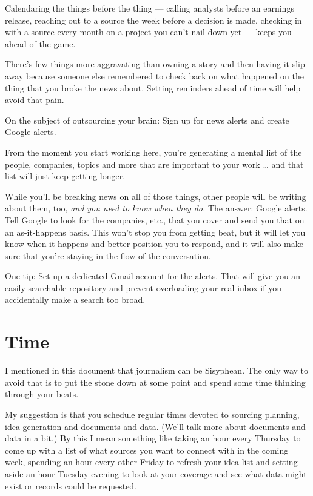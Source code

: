 \documentclass[
  12pt,
  american,
  letterpaperpaper,
  extrafontsizes,onecolumn,openright
  ]{memoir}
\begin{document}
Calendaring the things before the thing --- calling analysts before an earnings release, reaching out to a source the week before a decision is made, checking in with a source every month on a project you can't nail down yet --- keeps you ahead of the game.

There's few things more aggravating than owning a story and then having it slip away because someone else remembered to check back on what happened on the thing that you broke the news about. Setting reminders ahead of time will help avoid that pain.

On the subject of outsourcing your brain: Sign up for news alerts and create Google alerts.

From the moment you start working here, you're generating a mental list of the people, companies, topics and more that are important to your work \ldots{} and that list will just keep getting longer.

While you'll be breaking news on all of those things, other people will be writing about them, too, \emph{and you need to know when they do.} The answer: Google alerts. Tell Google to look for the companies, etc., that you cover and send you that on an as-it-happens basis. This won't stop you from getting beat, but it will let you know when it happens and better position you to respond, and it will also make sure that you're staying in the flow of the conversation.

One tip: Set up a dedicated Gmail account for the alerts. That will give you an easily searchable repository and prevent overloading your real inbox if you accidentally make a search too broad.

\hypertarget{time}{%
\section*{Time}\label{time}}

I mentioned in this document that journalism can be Sisyphean. The only way to avoid that is to put the stone down at some point and spend some time thinking through your beats.

My suggestion is that you schedule regular times devoted to sourcing planning, idea generation and documents and data. (We'll talk more about documents and data in a bit.) By this I mean something like taking an hour every Thursday to come up with a list of what sources you want to connect with in the coming week, spending an hour every other Friday to refresh your idea list and setting aside an hour Tuesday evening to look at your coverage and see what data might exist or records could be requested.
\end{document}
